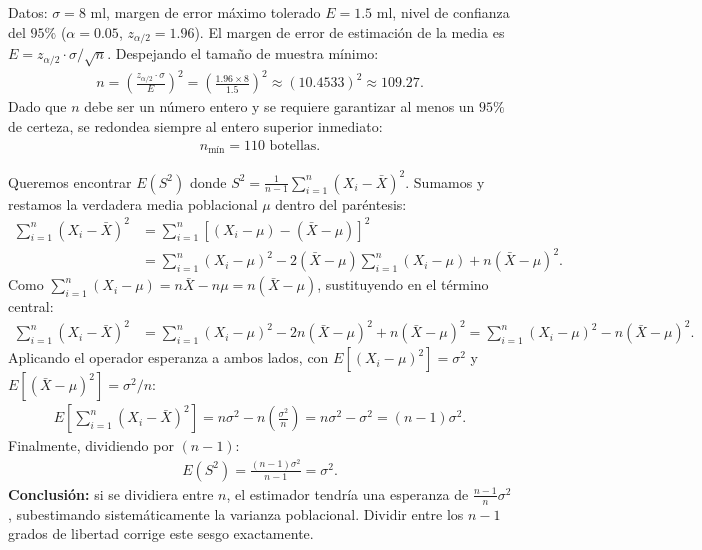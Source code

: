 \begin{solproblema}[prob:2da8cc3]
	Datos: $\sigma = 8$ ml, margen de error máximo tolerado $E = 1.5$ ml, nivel de confianza del $95\%$ ($\alpha = 0.05$, $z_{\alpha/2}=1.96$). El margen de error de estimación de la media es $E = z_{\alpha/2} \cdot \sigma/\sqrt{n}$. Despejando el tamaño de muestra mínimo:
	\begin{align}
		n = \left( \frac{z_{\alpha/2} \cdot \sigma}{E} \right)^2 = \left( \frac{1.96 \times 8}{1.5} \right)^2 \approx (10.4533)^2 \approx 109.27.
	\end{align}
	Dado que $n$ debe ser un número entero y se requiere garantizar al menos un $95\%$ de certeza, se redondea siempre al entero superior inmediato:
	\begin{align}
		n_{\text{mín}} = 110 \text{ botellas.}
	\end{align}
\end{solproblema}

\begin{solproblema}[prob:0c980d4]
	Queremos encontrar $E(S^2)$ donde $S^2 = \frac{1}{n-1} \sum_{i=1}^n (X_i - \bar{X})^2$. Sumamos y restamos la verdadera media poblacional $\mu$ dentro del paréntesis:
	\begin{align}
		\sum_{i=1}^n (X_i - \bar{X})^2 &= \sum_{i=1}^n [(X_i - \mu) - (\bar{X} - \mu)]^2 \\
		&= \sum_{i=1}^n (X_i - \mu)^2 - 2(\bar{X} - \mu) \sum_{i=1}^n (X_i - \mu) + n(\bar{X} - \mu)^2.
	\end{align}
	Como $\sum_{i=1}^n (X_i - \mu) = n\bar{X} - n\mu = n(\bar{X} - \mu)$, sustituyendo en el término central:
	\begin{align}
		\sum_{i=1}^n (X_i - \bar{X})^2 &= \sum_{i=1}^n (X_i - \mu)^2 - 2n(\bar{X} - \mu)^2 + n(\bar{X} - \mu)^2 = \sum_{i=1}^n (X_i - \mu)^2 - n(\bar{X} - \mu)^2.
	\end{align}
	Aplicando el operador esperanza a ambos lados, con $E[(X_i - \mu)^2] = \sigma^2$ y $E[(\bar{X} - \mu)^2] = \sigma^2/n$:
	\begin{align}
		E\left[ \sum_{i=1}^n (X_i - \bar{X})^2 \right] = n\sigma^2 - n\left(\frac{\sigma^2}{n}\right) = n\sigma^2 - \sigma^2 = (n-1)\sigma^2.
	\end{align}
	Finalmente, dividiendo por $(n-1)$:
	\begin{align}
		E(S^2) = \frac{(n-1)\sigma^2}{n-1} = \sigma^2.
	\end{align}
	\textbf{Conclusión:} si se dividiera entre $n$, el estimador tendría una esperanza de $\frac{n-1}{n}\sigma^2$, subestimando sistemáticamente la varianza poblacional. Dividir entre los $n-1$ grados de libertad corrige este sesgo exactamente.
\end{solproblema}


